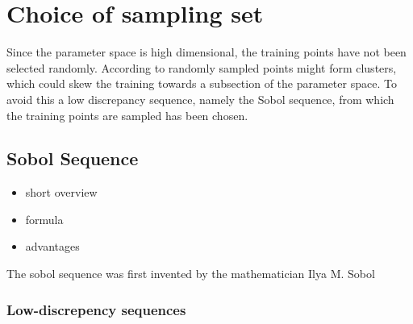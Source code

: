 	\section{Choice of sampling set}
		Since the parameter space is high dimensional, the training points have not been selected randomly. According to  randomly sampled points might form clusters, which could skew the training towards a subsection of the parameter space. To avoid this a low discrepancy sequence, namely the Sobol sequence, from which the training points are sampled has been chosen.
		\subsection{Sobol Sequence}
			\begin{itemize}
				\item short overview
				\item formula
				\item advantages
			\end{itemize}
			The sobol sequence was first invented by the mathematician Ilya M. Sobol 
			\subsubsection{Low-discrepency sequences}
